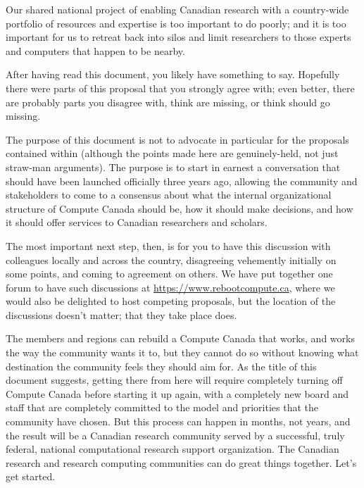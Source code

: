 \documentclass[11pt]{article}
\begin{document}
Our shared national project of enabling Canadian research with a
country-wide portfolio of resources and expertise is too important
to do poorly; and it is too important for us to retreat back into
silos and limit researchers to those experts and computers that
happen to be nearby.

After having read this document, you likely have something to say.
Hopefully there were parts of this proposal that you strongly agree
with; even better, there are probably parts you disagree with, think
are missing, or think should go missing.

The purpose of this document is not to advocate in particular for
the proposals contained within (although the points made here are
genuinely-held, not just straw-man arguments). The purpose is to
start in earnest a conversation that should have been launched
officially three years ago, allowing the community and stakeholders
to come to a consensus about what the internal organizational
structure of Compute Canada should be, how it should make decisions,
and how it should offer services to Canadian researchers and scholars.

The most important next step, then, is for you to have this discussion
with colleagues locally and across the country, disagreeing vehemently
initially on some points, and coming to agreement on others.  We
have put together one forum to have such discussions at
\url{https://www.rebootcompute.ca}, where we would also be delighted
to host competing proposals, but the location of the discussions
doesn't matter; that they take place does.

The members and regions can rebuild a Compute Canada that works,
and works the way the community wants it to, but they cannot do so
without knowing what destination the community feels they should
aim for. As the title of this document suggests, getting there from
here will require completely turning off Compute Canada before
starting it up again, with a completely new board and staff that
are completely committed to the model and priorities that the
community have chosen.  But this process can happen in months, not
years, and the result will be a Canadian research community served
by a successful, truly federal, national computational research
support organization.  The Canadian research and research computing
communities can do great things together.  Let's get started.
\end{document}
